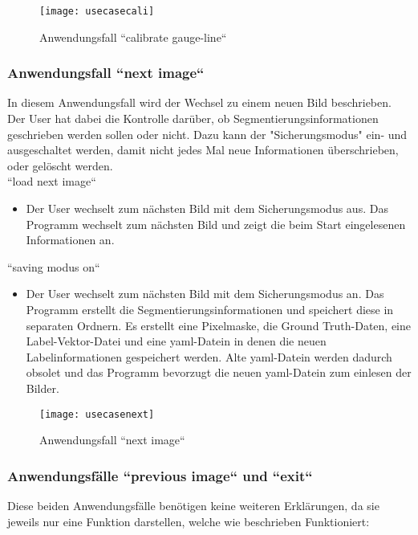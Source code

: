 \begin{figure}[H]
  \texttt{[image: usecasecali]}
  \caption{Anwendungsfall ``calibrate gauge-line``}
\end{figure}

\subsubsection{Anwendungsfall ``next image``}
\label{sec:Anwendungsfall ``next image`` }

In diesem Anwendungsfall wird der Wechsel zu einem neuen Bild beschrieben. Der User hat dabei die Kontrolle darüber, ob Segmentierungsinformationen geschrieben werden sollen oder nicht. Dazu kann der "Sicherungsmodus" ein- und ausgeschaltet werden, damit nicht jedes Mal neue Informationen überschrieben, oder gelöscht werden.
\\

\noindent
``load next image``
\begin{itemize}
	\item Der User wechselt zum nächsten Bild mit dem Sicherungsmodus aus. Das Programm wechselt zum nächsten Bild und zeigt die beim Start eingelesenen Informationen an.
\end{itemize}
\noindent
``saving modus on``
\begin{itemize}
	\item Der User wechselt zum nächsten Bild mit dem Sicherungsmodus an. Das Programm erstellt die Segmentierungsinformationen und speichert diese in separaten Ordnern. Es erstellt eine Pixelmaske, die Ground Truth-Daten, eine Label-Vektor-Datei und eine yaml-Datein in denen die neuen Labelinformationen gespeichert werden. Alte yaml-Datein werden dadurch obsolet und das Programm bevorzugt die neuen yaml-Datein zum einlesen der Bilder.
\end{itemize}
\begin{figure}[H]
  \texttt{[image: usecasenext]}
  \caption{Anwendungsfall ``next image``}
\end{figure}

\subsubsection{Anwendungsfälle ``previous image`` und ``exit``}
\label{sec:Anwendungsfälle ``previous image`` und ``exit``}

Diese beiden Anwendungsfälle benötigen keine weiteren Erklärungen, da sie jeweils nur eine Funktion darstellen, welche wie beschrieben Funktioniert:
\\

